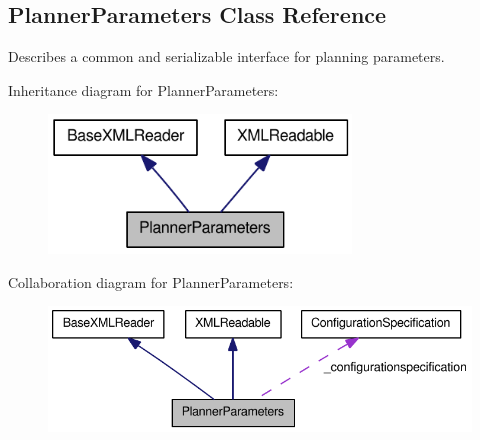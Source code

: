 \hypertarget{classOpenRAVE_1_1PlannerBase_1_1PlannerParameters}{
\subsection{PlannerParameters Class Reference}
\label{classOpenRAVE_1_1PlannerBase_1_1PlannerParameters}
}


Describes a common and serializable interface for planning parameters.  




Inheritance diagram for PlannerParameters:\nopagebreak
\begin{figure}[H]
\begin{center}
\leavevmode
\includegraphics[width=228pt]{classOpenRAVE_1_1PlannerBase_1_1PlannerParameters__inherit__graph}
\end{center}
\end{figure}


Collaboration diagram for PlannerParameters:\nopagebreak
\begin{figure}[H]
\begin{center}
\leavevmode
\includegraphics[width=380pt]{classOpenRAVE_1_1PlannerBase_1_1PlannerParameters__coll__graph}
\end{center}
\end{figure}
